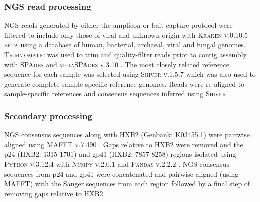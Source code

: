 \documentclass{article}[11pt]
\begin{document}
\subsubsection*{NGS read processing}
NGS reads generated by either the amplicon or bait-capture protocol were filtered to include only those of viral and unknown origin with \textsc{Kraken v.0.10.5-beta}  using a database of human, bacterial, archaeal, viral and fungal genomes. \textsc{Trimmomatic} was used to trim and quality-filter reads  prior to contig assembly with \textsc{SPAdes}  and \textsc{metaSPAdes v.3.10} . The most closely related reference sequence for each sample was selected using \textsc{Shiver v.1.5.7}  which was also used to generate complete sample-specific reference genomes. Reads were re-aligned to sample-specific references and consensus sequences inferred using \textsc{Shiver}. 

\subsubsection*{Secondary processing}
NGS consensus sequences along with HXB2 (Genbank: K03455.1) were pairwise aligned using \textsc{MAFFT v.7.490} . Gaps relative to HXB2 were removed and the p24 (HXB2: 1315-1701) and gp41 (HXB2: 7857-8258) regions isolated using \textsc{Python v.3.12.4}  with \textsc{Numpy v.2.0.1}  and \textsc{Pandas v.2.2.2} . NGS consensus sequences from p24 and gp41 were concatenated and pairwise aligned (using \textsc{MAFFT}) with the Sanger sequences from each region followed by a final step of removing gaps relative to HXB2. 
\end{document}
